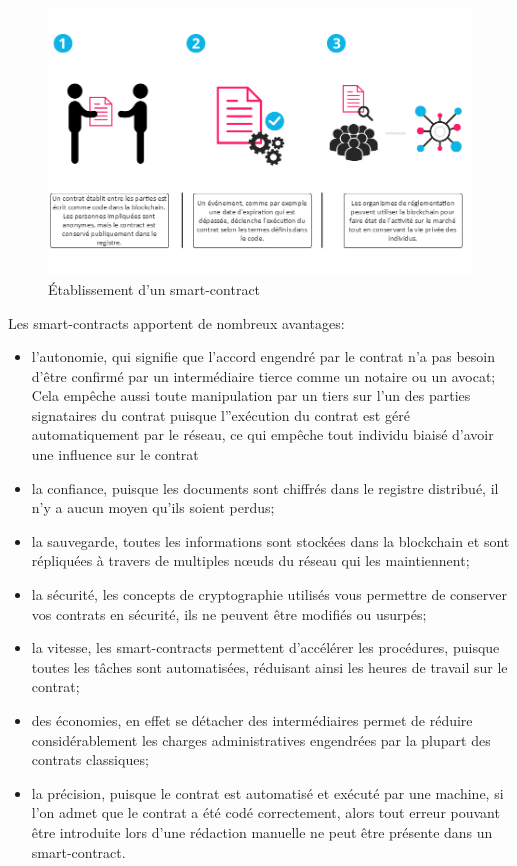 \documentclass{tnreport}
\begin{document}
\begin{figure}[h]
	\centering
	\includegraphics[scale=0.53]{figures/smart-contracts}
	\caption{Établissement d'un smart-contract \cite{smart-contracts}}
	\label{fig:smart-contracts}
\end{figure}

Les smart-contracts apportent de nombreux avantages:
\begin{itemize}
	\item l'autonomie, qui signifie que l'accord engendré par le contrat n'a pas besoin d'être confirmé par un intermédiaire tierce comme un notaire ou un avocat; Cela empêche aussi toute manipulation par un tiers sur l'un des parties signataires du contrat puisque l''exécution du contrat est géré automatiquement par le réseau, ce qui empêche tout individu biaisé d'avoir une influence sur le contrat
	\item la confiance, puisque les documents sont chiffrés dans le registre distribué, il n'y a aucun moyen qu'ils soient perdus;
	\item la sauvegarde, toutes les informations sont stockées dans la blockchain et sont répliquées à travers de multiples nœuds du réseau qui les maintiennent;
	\item la sécurité, les concepts de cryptographie utilisés vous permettre de conserver vos contrats en sécurité, ils ne peuvent être modifiés ou usurpés;
	\item la vitesse, les smart-contracts permettent d'accélérer les procédures, puisque toutes les tâches sont automatisées, réduisant ainsi les heures de travail sur le contrat;
	\item des économies, en effet se détacher des intermédiaires permet de réduire considérablement les charges administratives engendrées par la plupart des contrats classiques;
	\item la précision, puisque le contrat est automatisé et exécuté par une machine, si l'on admet que le contrat a été codé correctement, alors tout erreur pouvant être introduite lors d'une rédaction manuelle ne peut être présente dans un smart-contract.
\end{itemize}
\end{document}
